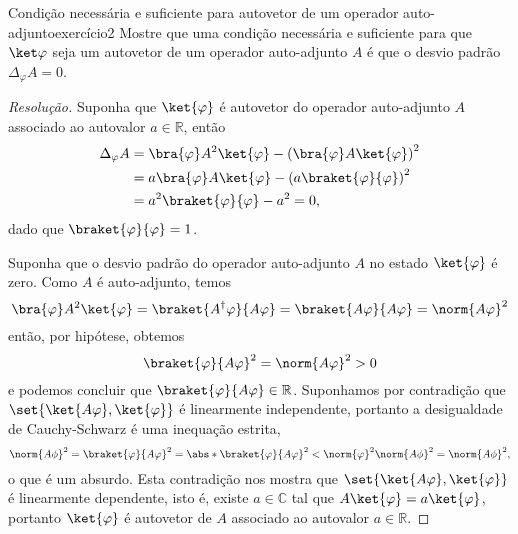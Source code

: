 \begin{exercício}{Condição necessária e suficiente para autovetor de um operador auto-adjunto}{exercício2}
    Mostre que uma condição necessária e suficiente para que \(\ket\varphi\) seja um autovetor de um operador auto-adjunto \(A\) é que o desvio padrão \(\Delta_\varphi A = 0\).
\end{exercício}
\begin{proof}[Resolução]
    Suponha que \(\ket{\varphi}\) é autovetor do operador auto-adjunto \(A\) associado ao autovalor \(a \in \mathbb{R}\), então
    \begin{align*}
        \Delta_\varphi A &= \bra{\varphi}A^2\ket{\varphi} - \left(\bra{\varphi}A\ket{\varphi}\right)^2\\
                         &= a\bra{\varphi}A\ket{\varphi} - \left(a\braket{\varphi}{\varphi}\right)^2\\
                         &= a^2\braket{\varphi}{\varphi} - a^2 = 0,
    \end{align*}
    dado que \(\braket{\varphi}{\varphi} = 1\).

    Suponha que o desvio padrão do operador auto-adjunto \(A\) no estado \(\ket{\varphi}\) é zero. Como \(A\) é auto-adjunto, temos
    \begin{equation*}
        \bra{\varphi}A^2\ket{\varphi} = \braket{A^\dagger \varphi}{A\varphi} = \braket{A\varphi}{A\varphi} = \norm{A\varphi}^2
    \end{equation*}
    então, por hipótese, obtemos
    \begin{equation*}
        \braket{\varphi}{A\varphi}^2 = \norm{A\varphi}^2 > 0
    \end{equation*}
    e podemos concluir que \(\braket{\varphi}{A \varphi} \in \mathbb{R}\). Suponhamos por contradição que \(\set{\ket{A\varphi}, \ket{\varphi}}\) é linearmente independente, portanto a desigualdade de Cauchy-Schwarz é uma inequação estrita,
    \begin{equation*}
        \norm{A \phi}^2 = \braket{\varphi}{A \varphi}^2 = \abs*{\braket{\varphi}{A \varphi}}^2 < \norm{\varphi}^2 \norm{A \phi}^2 = \norm{A \phi}^2,
    \end{equation*}
    o que é um absurdo. Esta contradição nos mostra que \(\set{\ket{A \varphi}, \ket{\varphi}}\) é linearmente dependente, isto é, existe \(a \in \mathbb{C}\) tal que \(A\ket{\varphi} = a \ket{\varphi}\), portanto \(\ket{\varphi}\) é autovetor de \(A\) associado ao autovalor \(a \in \mathbb{R}\).
\end{proof}
